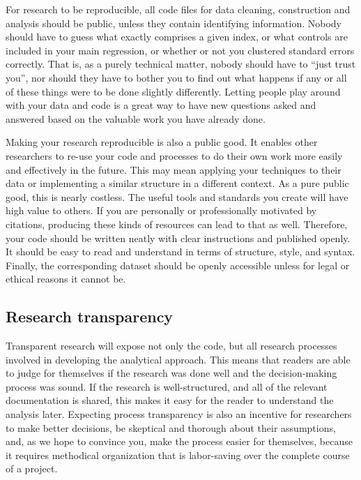 For research to be reproducible, 
all code files for data cleaning, construction and analysis
should be public, unless they contain identifying information.
Nobody should have to guess what exactly comprises a given index,
or what controls are included in your main regression,
or whether or not you clustered standard errors correctly.
That is, as a purely technical matter, nobody should have to ``just trust you'',
nor should they have to bother you to find out what happens
if any or all of these things were to be done slightly differently.\cite{simmons2011false,simonsohn2015specification,wicherts2016degrees}
Letting people play around with your data and code
is a great way to have new questions asked and answered
based on the valuable work you have already done.

Making your research reproducible is also a public good.
It enables other researchers to re-use your code and processes
to do their own work more easily and effectively in the future.
This may mean applying your techniques to their data
or implementing a similar structure in a different context.
As a pure public good, this is nearly costless.
The useful tools and standards you create will have high value to others.
If you are personally or professionally motivated by citations,
producing these kinds of resources can lead to that as well.
Therefore, your code should be written neatly with clear instructions and published openly.
It should be easy to read and understand in terms of structure, style, and syntax.
Finally, the corresponding dataset should be openly accessible
unless for legal or ethical reasons it cannot be.

\subsection{Research transparency}

Transparent research will expose not only the code,
but all research processes involved in developing the analytical approach.
This means that readers are able to judge for themselves if the research was done well
and the decision-making process was sound.
If the research is well-structured, and all of the relevant documentation
is shared, this makes it easy for the reader to understand the analysis later.
Expecting process transparency is also an incentive for researchers to make better decisions,
be skeptical and thorough about their assumptions,
and, as we hope to convince you, make the process easier for themselves,
because it requires methodical organization that is labor-saving over the complete course of a project.

